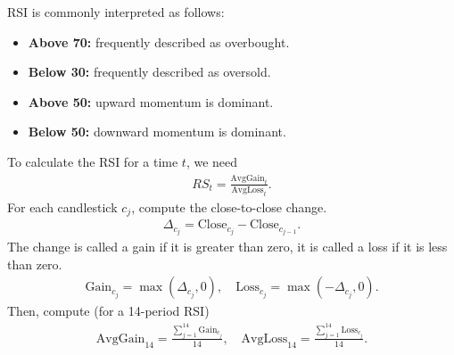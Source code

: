 \documentclass[letterpaper, 11pt]{article}
\newcommand{\1}{\mathds{1}}		%
\theoremstyle{definition}
\begin{document}
    RSI is commonly interpreted as follows:
    \begin{itemize}
        \item \textbf{Above 70:} frequently described as overbought.
        \item \textbf{Below 30:} frequently described as oversold.
        \item \textbf{Above 50:} upward momentum is dominant.
        \item \textbf{Below 50:} downward momentum is dominant.
    \end{itemize}
    To calculate the RSI for a time $t$, we need
    \begin{align*}
        RS_{t} = \frac{\text{AvgGain}_{t}}{\text{AvgLoss}_{t}}
    .\end{align*}
    For each candlestick $c_{j}$, compute the close-to-close change.
    \begin{align*}
        \Delta_{c_{j}} = \text{Close}_{c_{j}} - \text{Close}_{c_{j-1}}
    .\end{align*}
    The change is called a gain if it is greater than zero, it is called a loss if it is less than zero.
    \begin{align*}
        \text{Gain}_{c_{j}} = \max(\Delta_{c_{j}}, 0), \quad 
        \text{Loss}_{c_{j}} = \max(-\Delta_{c_{j}}, 0)
    .\end{align*}
    Then, compute (for a 14-period RSI)
    \begin{align*}
        \text{AvgGain}_{14} = \frac{\sum_{j=1}^{14}\text{Gain}_{c_{j}}}{14}, \quad
        \text{AvgLoss}_{14} = \frac{\sum_{j=1}^{14}\text{Loss}_{c_{j}}}{14}
    .\end{align*}

    \bigbreak \noindent 
\end{document}
